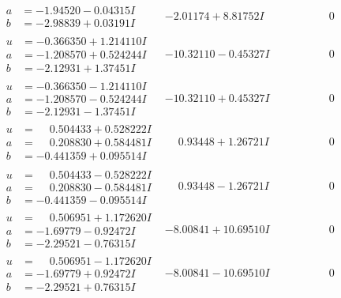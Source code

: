 \documentclass[1p]{elsarticle_modified}
\theoremstyle{definition}
\begin{document}
$$\begin{array}{c|c|c}
\begin{aligned}
a &= -1.94520 - 0.04315 I \\
b &= -2.98839 + 0.03191 I\end{aligned}
 & -2.01174 + 8.81752 I & \phantom{-0.000000 } 0 \\ \hline\begin{aligned}
u &= -0.366350 + 1.214110 I \\
a &= -1.208570 + 0.524244 I \\
b &= -2.12931 + 1.37451 I\end{aligned}
 & -10.32110 - 0.45327 I & \phantom{-0.000000 } 0 \\ \hline\begin{aligned}
u &= -0.366350 - 1.214110 I \\
a &= -1.208570 - 0.524244 I \\
b &= -2.12931 - 1.37451 I\end{aligned}
 & -10.32110 + 0.45327 I & \phantom{-0.000000 } 0 \\ \hline\begin{aligned}
u &= \phantom{-}0.504433 + 0.528222 I \\
a &= \phantom{-}0.208830 + 0.584481 I \\
b &= -0.441359 + 0.095514 I\end{aligned}
 & \phantom{-}0.93448 + 1.26721 I & \phantom{-0.000000 } 0 \\ \hline\begin{aligned}
u &= \phantom{-}0.504433 - 0.528222 I \\
a &= \phantom{-}0.208830 - 0.584481 I \\
b &= -0.441359 - 0.095514 I\end{aligned}
 & \phantom{-}0.93448 - 1.26721 I & \phantom{-0.000000 } 0 \\ \hline\begin{aligned}
u &= \phantom{-}0.506951 + 1.172620 I \\
a &= -1.69779 - 0.92472 I \\
b &= -2.29521 - 0.76315 I\end{aligned}
 & -8.00841 + 10.69510 I & \phantom{-0.000000 } 0 \\ \hline\begin{aligned}
u &= \phantom{-}0.506951 - 1.172620 I \\
a &= -1.69779 + 0.92472 I \\
b &= -2.29521 + 0.76315 I\end{aligned}
 & -8.00841 - 10.69510 I & \phantom{-0.000000 } 0 \\ \hline\begin{aligned}

\end{aligned}
\end{array}$$
\end{document}
